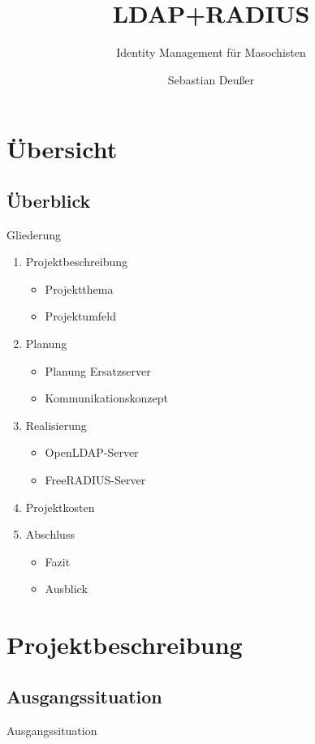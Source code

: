 \documentclass[handout,svgnames]{beamer}
\title[OpenLDAP- und FreeRADIUS-Server]   %
{LDAP+RADIUS}
\subtitle
{Identity Management für Masochisten} %
\author %
{Sebastian Deußer}
\begin{document}
\begin{frame}
  \titlepage
\end{frame}

\section{Übersicht}
\subsection{Überblick}
\begin{frame}{Gliederung}
	\begin{enumerate}
		\item Projektbeschreibung
		\begin{itemize}
			\item Projektthema
			\item Projektumfeld
		\end{itemize}
		\item Planung
		\begin{itemize}
			\item Planung Ersatzserver
			\item Kommunikationskonzept
		\end{itemize}
		\item Realisierung
		\begin{itemize}
			\item OpenLDAP-Server
			\item FreeRADIUS-Server
		\end{itemize}
		\item Projektkosten
		\item Abschluss
		\begin{itemize}
			\item Fazit
			\item Ausblick
		\end{itemize}
	\end{enumerate}
\end{frame}
\note{}

\section{Projektbeschreibung}
\subsection{Ausgangssituation}
\begin{frame}{Ausgangssituation}

\end{frame}
\end{document}
